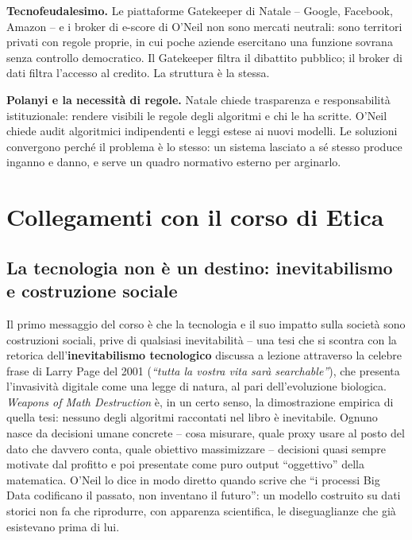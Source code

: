 \documentclass[a4paper,11pt]{article}
\begin{document}
\textbf{Tecnofeudalesimo.} Le piattaforme Gatekeeper di Natale -- Google, Facebook, Amazon -- e i broker di e-score di O'Neil non sono mercati neutrali: sono territori privati con regole proprie, in cui poche aziende esercitano una funzione sovrana senza controllo democratico. Il Gatekeeper filtra il dibattito pubblico; il broker di dati filtra l'accesso al credito. La struttura è la stessa.

\textbf{Polanyi e la necessità di regole.} Natale chiede trasparenza e responsabilità istituzionale: rendere visibili le regole degli algoritmi e chi le ha scritte. O'Neil chiede audit algoritmici indipendenti e leggi estese ai nuovi modelli. Le soluzioni convergono perché il problema è lo stesso: un sistema lasciato a sé stesso produce inganno e danno, e serve un quadro normativo esterno per arginarlo.

\section{Collegamenti con il corso di Etica}

\subsection{La tecnologia non è un destino: inevitabilismo e costruzione sociale}

Il primo messaggio del corso è che la tecnologia e il suo impatto sulla società sono costruzioni sociali, prive di qualsiasi inevitabilità -- una tesi che si scontra con la retorica dell'\textbf{inevitabilismo tecnologico} discussa a lezione attraverso la celebre frase di Larry Page del 2001 (\emph{``tutta la vostra vita sarà searchable''}), che presenta l'invasività digitale come una legge di natura, al pari dell'evoluzione biologica. \emph{Weapons of Math Destruction} è, in un certo senso, la dimostrazione empirica di quella tesi: nessuno degli algoritmi raccontati nel libro è inevitabile. Ognuno nasce da decisioni umane concrete -- cosa misurare, quale proxy usare al posto del dato che davvero conta, quale obiettivo massimizzare -- decisioni quasi sempre motivate dal profitto e poi presentate come puro output ``oggettivo'' della matematica. O'Neil lo dice in modo diretto quando scrive che ``i processi Big Data codificano il passato, non inventano il futuro'': un modello costruito su dati storici non fa che riprodurre, con apparenza scientifica, le diseguaglianze che già esistevano prima di lui.
\end{document}
